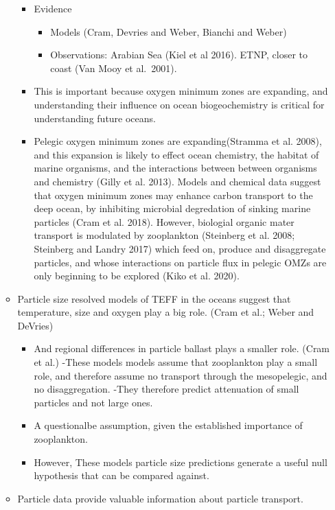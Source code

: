 \documentclass[]{article}
\providecommand{\tightlist}{%
  \setlength{\itemsep}{0pt}\setlength{\parskip}{0pt}}
\begin{document}
\begin{itemize}
\begin{itemize}
    \begin{itemize}
    \tightlist
    \item
      Evidence

      \begin{itemize}
      \tightlist
      \item
        Models (Cram, Devries and Weber, Bianchi and Weber)
      \item
        Observations: Arabian Sea (Kiel et al 2016). ETNP, closer to
        coast (Van Mooy et al.~2001).
      \end{itemize}
    \item
      This is important because oxygen minimum zones are expanding, and
      understanding their influence on ocean biogeochemistry is critical
      for understanding future oceans.
    \item
      Pelegic oxygen minimum zones are expanding(Stramma et al. 2008),
      and this expansion is likely to effect ocean chemistry, the
      habitat of marine organisms, and the interactions between between
      organisms and chemistry (Gilly et al. 2013). Models and chemical
      data suggest that oxygen minimum zones may enhance carbon
      transport to the deep ocean, by inhibiting microbial degredation
      of sinking marine particles (Cram et al. 2018). However, biologial
      organic mater transport is modulated by zooplankton (Steinberg et
      al. 2008; Steinberg and Landry 2017) which feed on, produce and
      disaggregate particles, and whose interactions on particle flux in
      pelegic OMZs are only beginning to be explored (Kiko et al. 2020).
    \end{itemize}
  \item
    Particle size resolved models of TEFF in the oceans suggest that
    temperature, size and oxygen play a big role. (Cram et al.; Weber
    and DeVries)

    \begin{itemize}
    \tightlist
    \item
      And regional differences in particle ballast plays a smaller role.
      (Cram et al.) -These models models assume that zooplankton play a
      small role, and therefore assume no transport through the
      mesopelegic, and no disaggregation. -They therefore predict
      attenuation of small particles and not large ones.
    \item
      A questionalbe assumption, given the established importance of
      zooplankton.
    \item
      However, These models particle size predictions generate a useful
      null hypothesis that can be compared against.
    \end{itemize}
  \item
    Particle data provide valuable information about particle transport.


\end{itemize}
\end{itemize}
\end{document}
